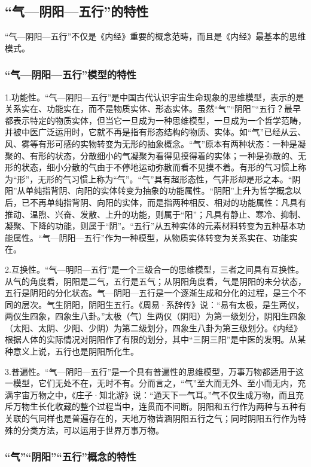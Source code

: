 \documentclass[draft,12pt]{ctexbook}
\begin{document}
\subsection{“气—阴阳—五行”的特性}%

“气—阴阳—五行”不仅是《内经》重要的概念范畴，而且是《内经》最基本的思维模式。

\subsubsection{“气—阴阳—五行”模型的特性}%

1.功能性。“气—阴阳—五行”是中国古代认识宇宙生命现象的思维模型，表示的是关系实在、功能实在，而不是物质实体、形态实体。虽然“气”“阴阳”“五行？最早都表示特定的物质实体，但当它一旦成为一种思维模型，一旦成为一个哲学范畴，并被中医广泛运用时，它就不再是指有形态结构的物质、实体。如“气”已经从云、风、雾等有形可感的实物转变为无形的抽象概念。“气”原本有两种状态：一种是凝聚的、有形的状态，分散细小的气凝聚为看得见摸得着的实体；一种是弥散的、无形的状态，细小分散的气由于不停地运动弥散而看不见摸不着。有形的气习惯上称为“形”，无形的气习惯上称为“气”。“气”具有超形态性，气非形却是形之本。“阴阳”从单纯指背阴、向阳的实体转变为抽象的功能属性。“阴阳”上升为哲学概念以后，已不再单纯指背阴、向阳的实体，而是指两种相反、相对的功能属性：凡具有推动、温煦、兴奋、发散、上升的功能，则属于“阳”；凡具有静止、寒冷、抑制、凝聚、下降的功能，则属于“阴”。“五行”从五种实体的元素材料转变为五种基本功能属性。“气—阴阳—五行”作为一种模型，从物质实体转变为关系实在、功能实在。

2.互换性。“气—明阳—五行”是一个三级合一的思维模型，三者之间具有互换性。从气的角度看，阴阳是二气，五行是五气；从阴阳角度看，气是阴阳的未分状态，五行是阴阳的分化状态。气—阴阳—五行是一个逐渐生成和分化的过程，是三个不同的层次。气生阴阳，阴阳生五行。《周易·系辞传》说：“易有太极，是生两仪，两仪生四象，四象生八卦。”太极（气）生两仪（阴阳）为第一级划分，阴阳生四象（太阳、太阴、少阳、少阴）为第二级划分，四象生八卦为第三级划分。《内经》根据人体的实际情况对阴阳作了有限的划分，其中“三阴三阳”是中医的发明。从某种意义上说，五行也是阴阳所化生。

3.普遍性。“气—阴阳—五行”是一个具有普遍性的思维模型，万事万物都适用于这一模型，它们无处不在，无时不有。分而言之，“气”至大而无外、至小而无内，充满宇宙万物之中，《庄子·知北游》说：“通天下一气耳。”气不仅生成万物，而且充斥万物生长化收藏的整个过程当中，连贯而不间断。阴阳和五行作为两种与五种有关联的气同样也是普遍存在的，天地万物皆涵阴阳五行之气；同时阴阳五行作为特殊的分类方法，可以运用于世界万事万物。

\subsubsection{“气”“阴阳”“五行”概念的特性}%
\end{document}
